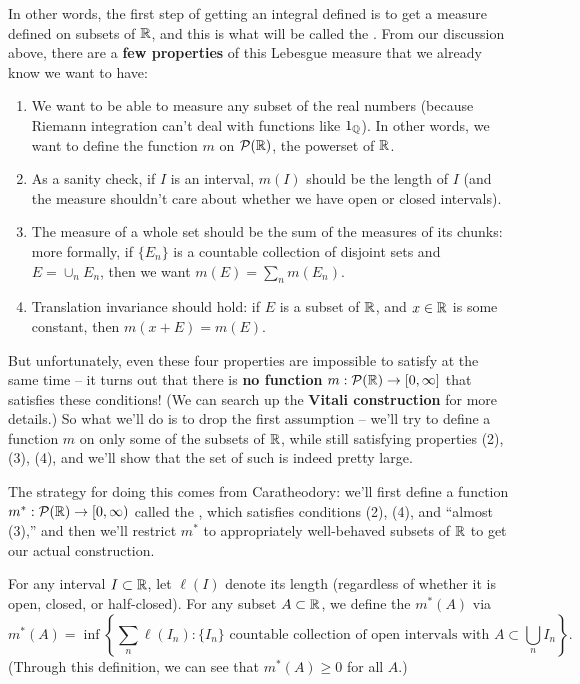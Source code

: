 In other words, the first step of getting an integral defined is to get a measure defined on subsets of $\mathbb R$, and this is what will be called the . From our discussion above, there are a \textbf{few properties} of this Lebesgue measure that we already know we want to have:

\begin{enumerate}
\item We want to be able to measure any subset of the real numbers (because Riemann integration can't deal with functions like $1_{\mathbb Q}$). In other words, we want to define the function $m$ on $\mathcal{P}(\mathbb R)$, the powerset of $\mathbb R$.
\item As a sanity check, if $I$ is an interval, $m(I)$ should be the length of $I$ (and the measure shouldn't care about whether we have open or closed intervals). 
\item The measure of a whole set should be the sum of the measures of its chunks: more formally, if $\{E_n\}$ is a countable collection of disjoint sets and $E = \cup_n E_n$, then we want $m(E) = \sum_{n} m(E_n)$.
\item Translation invariance should hold: if $E$ is a subset of $\mathbb R$, and $x \in \mathbb R$ is some constant, then $m(x+E) = m(E)$.
\end{enumerate}

But unfortunately, even these four properties are impossible to satisfy at the same time -- it turns out that there is \textbf{no function} $m: \mathcal{P}(\mathbb R) \to [0, \infty]$ that satisfies these conditions! (We can search up the \textbf{Vitali construction} for more details.) So what we'll do is to drop the first assumption -- we'll try to define a function $m$ on only some of the subsets of $\mathbb R$, while still satisfying properties (2), (3), (4), and we'll show that the set of such  is indeed pretty large.

The strategy for doing this comes from Caratheodory: we'll first define a function $m^\ast: \mathcal{P}(\mathbb R) \to [0, \infty)$ called the , which satisfies conditions (2), (4), and ``almost (3),'' and then we'll restrict $m^\ast$ to appropriately well-behaved subsets of $\mathbb R$ to get our actual construction. 

\begin{definition}
For any interval $I \subset \mathbb R$, let $\ell(I)$ denote its length (regardless of whether it is open, closed, or half-closed). For any subset $A \subset \mathbb R$, we define the  $m^\ast(A)$ via
\[
    m^\ast(A) = \inf\left\{\sum_n \ell(I_n): \{I_n\} \text{ countable collection of open intervals with }A \subset \bigcup_n I_n\right\}.
\]
(Through this definition, we can see that $m^\ast(A) \ge 0$ for all $A$.)
\end{definition}

